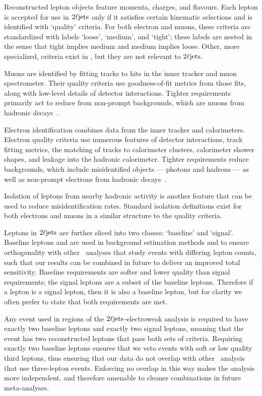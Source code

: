 Reconstructed lepton objects feature momenta, charges, and flavours.
Each lepton is accepted for use in $2\ell\mathrm{jets}$ only if it satisfies certain
kinematic selections and is identified with `quality' criteria.
For both electron and muons, these criteria are standardized with labels
`loose', `medium', and `tight';
these labels are nested in the sense that tight implies medium
and medium implies loose.
Other, more specialized, criteria exist in \atlas, but they are not relevant
to $2\ell\mathrm{jets}$.

Muons are identified by fitting tracks to hits in the inner tracker and muon
spectrometer.
Their quality criteria use goodness-of-fit metrics from those fits, along with
low-level details of detector interactions.
Tighter requirements primarily act to reduce from non-prompt backgrounds,
which are muons from hadronic decays~\cite{atlas_muon_quality_MUON_2018_03}.

Electron identification combines data from the inner tracker and
calorimeters.
Electron quality criteria use numerous features of detector
interactions, track fitting metrics, the matching of tracks to calorimeter
clusters, calorimeter shower shapes, and leakage into the hadronic calorimeter.
Tighter requirements reduce backgrounds, which include misidentified objects
--- photons and hadrons --- as well as non-prompt electrons from hadronic
decays~\cite{atlas_egamma_quality_EGAM_2018_01}.

Isolation of leptons from nearby hadronic activity is another feature that
can be used to reduce misidentification rates.
Standard isolation definitions exist for both electrons and muons in a similar
structure to the quality criteria.

Leptons in $2\ell\mathrm{jets}$ are further sliced into two classes:
`baseline' and `signal'.
Baseline leptons and are used in background estimation methods and to ensure
orthogonality with other \atlas\ analyses that study events with differing
lepton counts, such that our results can be combined in future to deliver an
improved total sensitivity.
Baseline requirements are softer and lower quality than signal requirements;
the signal leptons are a subset of the baseline leptons.
Therefore if a lepton is a signal lepton, then it is also a baseline lepton,
but for clarity we often prefer to state that both requirements are met.

Any event used in regions of the $2\ell\mathrm{jets}$-electroweak analysis is required
to have exactly two baseline leptons and exactly two signal leptons, meaning
that the event has two reconstructed leptons that pass both sets of criteria.
Requiring exactly two baseline leptons ensures that we veto events with soft
or low quality third leptons, thus ensuring that our data do not overlap with
other \atlas\ analysis that use three-lepton events.
Enforcing no overlap in this way makes the analysis more independent, and
therefore amenable to cleaner combinations in future meta-analyses.

